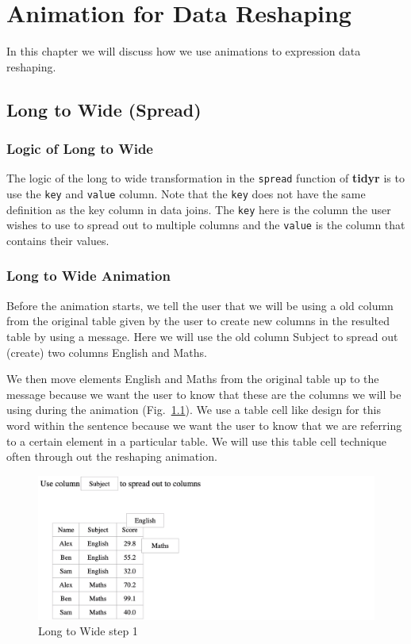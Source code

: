 %
\chapter{Animation for Data Reshaping} \label{c5} %

In this chapter we will discuss how we use animations to expression data reshaping.

\section{Long to Wide (Spread)}

\subsection{Logic of Long to Wide}
The logic of the long to wide transformation in the \texttt{spread} function of \textbf{tidyr} is to use the \texttt{key} and \texttt{value} column. Note that the \texttt{key} does not have the same definition as the key column in data joins. The \texttt{key} here is the column the user wishes to use to spread out to multiple columns and the \texttt{value} is the column that contains their values.

\subsection{Long to Wide Animation}
Before the animation starts, we tell the user that we will be using a old column from the original table given by the user to create new columns in the resulted table by using a message. Here we will use the old column Subject to spread out (create) two columns English and Maths.

We then move elements English and Maths from the original table up to the message because we want the user to know that these are the columns we will be using during the animation (Fig.~\ref{fig:spread1}). We use a table cell like design for this word within the sentence because we want the user to know that we are referring to a certain element in a particular table. We will use this table cell technique often through out the reshaping animation.

\begin{figure}[H]
    \includegraphics[scale = 0.35]{Masters-Thesis/img/spread1.png}
    \caption{Long to Wide step 1}
    \label{fig:spread1}
\end{figure}

